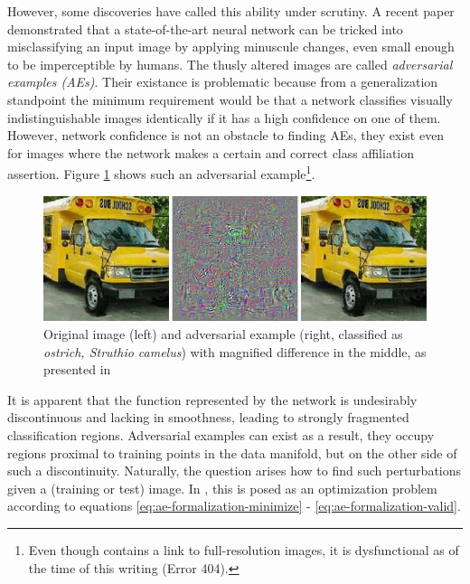 \documentclass[11pt, a4paper]{article}
\begin{document}
However, some discoveries have called this ability under scrutiny. A recent paper \cite{intriguing-properties-of-neural-networks} demonstrated that a state-of-the-art neural network can be tricked into misclassifying an input image by applying minuscule changes, even small enough to be imperceptible by humans. The thusly altered images are called \emph{adversarial examples (AEs)}. Their existance is problematic because from a generalization standpoint the minimum requirement would be that a network classifies visually indistinguishable images identically if it has a high confidence on one of them. However, network confidence is not an obstacle to finding AEs, they exist even for images where the network makes a certain and correct class affiliation assertion. Figure \ref{fig:intriguing-properties-ae} shows such an adversarial example\footnote{Even though \cite{intriguing-properties-of-neural-networks} contains a link to full-resolution images, it is dysfunctional as of the time of this writing (Error 404).}.

\begin{figure}[h!tb]
\centering
	\includegraphics[width=\textwidth]{images/intruiging_properties_ae.png}
	\caption[Adversarial example from \cite{intriguing-properties-of-neural-networks}]{Original image (left) and adversarial example (right, classified as \emph{ostrich, Struthio
camelus}) with magnified difference in the middle, as presented in \cite{intriguing-properties-of-neural-networks}}
	\label{fig:intriguing-properties-ae}
\end{figure}

It is apparent that the function represented by the network is undesirably discontinuous and lacking in smoothness, leading to strongly fragmented classification regions. Adversarial examples can exist as a result, they occupy regions proximal to training points in the data manifold, but on the other side of such a discontinuity. Naturally, the question arises how to find such perturbations given a (training or test) image. In \cite{intriguing-properties-of-neural-networks}, this is posed as an optimization problem according to equations \eqref{eq:ae-formalization-minimize} - \eqref{eq:ae-formalization-valid}.
\end{document}
